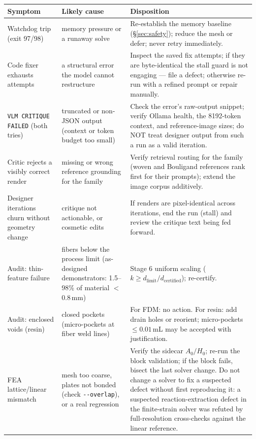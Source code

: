 \documentclass[11pt]{article}
\begin{document}
\begin{longtable}{@{}p{4.6cm}p{4.6cm}p{5.2cm}@{}}
\toprule
Symptom & Likely cause & Disposition \\
\midrule
Watchdog trip (exit 97/98) & memory pressure or a runaway solve & Re-establish the memory baseline
(\S\ref{sec:safety}); reduce the mesh or defer; never retry immediately. \\
Code fixer exhausts attempts & a structural error the model cannot restructure & Inspect the saved fix
attempts; if they are byte-identical the stall guard is not engaging --- file a defect; otherwise
re-run with a refined prompt or repair manually. \\
\texttt{VLM CRITIQUE FAILED} (both tries) & truncated or non-JSON output (context or token budget too
small) & Check the error's raw-output snippet; verify Ollama health, the 8192-token context, and
reference-image sizes; do NOT treat designer output from such a run as a valid iteration. \\
Critic rejects a visibly correct render & missing or wrong reference grounding for the family & Verify
retrieval routing for the family (woven and Bouligand references rank first for their prompts); extend
the image corpus additively. \\
Designer iterations churn without geometry change & critique not actionable, or cosmetic edits & If
renders are pixel-identical across iterations, end the run (stall) and review the critique text being
fed forward. \\
Audit: thin-feature failure & fibers below the process limit (as-designed demonstrators: 1.5--98\% of
material $<$ 0.8\,mm) & Stage 6 uniform scaling ($k \ge d_\mathrm{limit}/d_\mathrm{certified}$);
re-certify. \\
Audit: enclosed voids (resin) & closed pockets (micro-pockets at fiber weld lines) & For FDM: no
action. For resin: add drain holes or reorient; micro-pockets $\le 0.01$\,mL may be accepted with
justification. \\
FEA lattice/linear mismatch & mesh too coarse, plates not bonded (check \texttt{-{}-overlap}), or a
real regression & Verify the sidecar $A_0/H_0$; re-run the block validation; if the block fails, bisect
the last solver change. Do not change a solver to fix a suspected defect without first reproducing it:
a suspected reaction-extraction defect in the finite-strain solver was refuted by full-resolution
cross-checks against the linear reference. \\
\bottomrule
\end{longtable}
\end{document}
